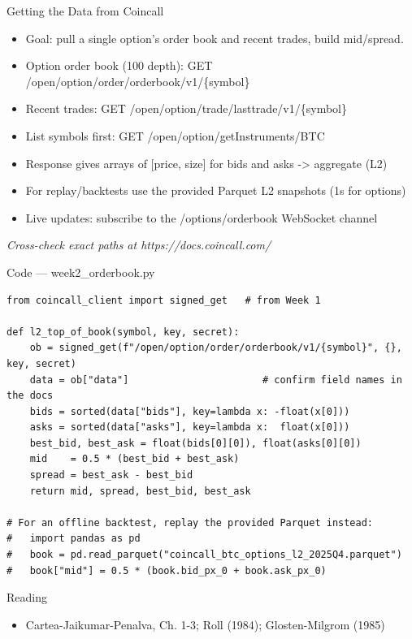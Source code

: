 \documentclass[aspectratio=169,10pt]{beamer}
\begin{document}
\begin{frame}{Getting the Data from Coincall}
\begin{itemize}
  \item Goal: pull a single option's order book and recent trades, build mid/spread.
  \item Option order book (100 depth):  GET /open/option/order/orderbook/v1/\{symbol\}
  \item Recent trades:                   GET /open/option/trade/lasttrade/v1/\{symbol\}
  \item List symbols first:              GET /open/option/getInstruments/BTC
  \item Response gives arrays of [price, size] for bids and asks -\textgreater{} aggregate (L2)
  \item For replay/backtests use the provided Parquet L2 snapshots (1s for options)
  \item Live updates: subscribe to the /options/orderbook WebSocket channel
\end{itemize}
\vspace{2pt}\tiny\textit{Cross-check exact paths at https://docs.coincall.com/}
\end{frame}

\begin{frame}[fragile]{Code --- week2\_orderbook.py}
\begin{lstlisting}
from coincall_client import signed_get   # from Week 1

def l2_top_of_book(symbol, key, secret):
    ob = signed_get(f"/open/option/order/orderbook/v1/{symbol}", {}, key, secret)
    data = ob["data"]                       # confirm field names in the docs
    bids = sorted(data["bids"], key=lambda x: -float(x[0]))
    asks = sorted(data["asks"], key=lambda x:  float(x[0]))
    best_bid, best_ask = float(bids[0][0]), float(asks[0][0])
    mid    = 0.5 * (best_bid + best_ask)
    spread = best_ask - best_bid
    return mid, spread, best_bid, best_ask

# For an offline backtest, replay the provided Parquet instead:
#   import pandas as pd
#   book = pd.read_parquet("coincall_btc_options_l2_2025Q4.parquet")
#   book["mid"] = 0.5 * (book.bid_px_0 + book.ask_px_0)
\end{lstlisting}
\end{frame}
\begin{frame}{Reading}
\begin{itemize}
  \item Cartea-Jaikumar-Penalva, Ch. 1-3; Roll (1984); Glosten-Milgrom (1985)
\end{itemize}
\end{frame}
\end{document}
